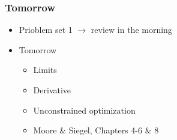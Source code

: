 \documentclass[pdflatex, 12pt]{beamer}
\begin{document}
\begin{frame}
\frametitle{Tomorrow}
\begin{itemize}
\item Prioblem set 1 $\rightarrow$ review in the morning
\vspace{0.4cm}
\item Tomorrow
 \begin{itemize}
 \item Limits
 \item Derivative
 \item Unconstrained optimization
 \item Moore \& Siegel, Chapters 4-6 \& 8
 \end{itemize}
\end{itemize}
\end{frame}
\end{document}

